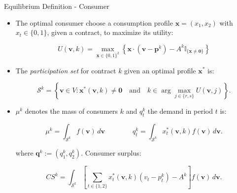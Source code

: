 \documentclass{class}
\begin{document}
\begin{frame}{Equilibrium Definition - Consumer}

\small
\begin{itemize}

\item The optimal consumer choose a consumption profile $\textbf{x} = (x_1,x_2)$ with $x_t \in\{0,1\}$, given a contract, to maximize its utility:

\vfill

\begin{equation*}
    U(\mathbf{v}, k) = \max_{\mathbf{x} \in \{0,1\}^2} \left\{ \mathbf{x} \cdot (\mathbf{v} - \mathbf{p}^k) - A^k \mathbb{I}_{\{\mathbf{x} \neq \mathbf{0}\}} \right\}
\end{equation*}

\vfill

\item The \textit{participation set} for contract $k$ given an optimal profile $\textbf{x}^\ast$ is:

\begin{equation*} \label{eq:active_set_general}
    \mathcal{S}^k = \left\{ \mathbf{v} \in V : \mathbf{x}^*(\mathbf{v},k) \neq \mathbf{0} \quad \text{and} \quad k \in \arg\max_{j \in \{r,s\}} U(\mathbf{v}, j) \right\}.
\end{equation*}

\vfill

\item $\mu^k$ denotes the mass of consumers $k$ and $q_t^k$ the demand in period $t$ is:
  \vfill

\begin{equation*}
    \mu^k = \int_{\mathcal{S}^k} f(\mathbf{v}) \, d\mathbf{v} \qquad \qquad  q_t^k = \int_{\mathcal{S}^k} x_t^*(\mathbf{v}, k) f(\mathbf{v}) \, d\mathbf{v}.
\end{equation*}

 where  $\mathbf{q}^k:= (q^k_1,q^k_2)$. Consumer surplus:


 \begin{equation*}
    CS^k
    =
    \int_{\mathcal{S}^k}
    \left[
    \sum_{t\in\{1,2\}}
    x_t^*(\mathbf{v},k)
    \left(v_t-p_t^k\right)
    -
    A^k
    \right]
    f(\mathbf{v})\,d\mathbf{v}.
\end{equation*}

\end{itemize}
    
\end{frame}


\end{document}
